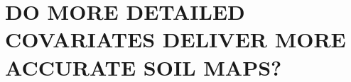 \artigotrue
\chapter{DO MORE DETAILED COVARIATES DELIVER MORE ACCURATE SOIL MAPS?}
\label{chap:chap05}

\def\elev{\texttt{ELEV}} %
\def\slp{\texttt{SLP}}   %
\def\asp{\texttt{ASP}}   %
\def\nor{\texttt{NOR}}   %
\def\acc{\texttt{ACC}}   %
\def\twi{\texttt{TWI}}   %
\def\spi{\texttt{SPI}}   %
\def\tpi{\texttt{TPI}}   %
\def\ndvi{\texttt{NDVI}} %
\def\savi{\texttt{SAVI}} %
\def\sibcs{Brazilian System of Soil Classification}

\def\portuguesekeys{Mapeamento Digital do Solo, Modelo Linear Misto, Informação Auxiliar, Seleção de Variáveis,
Acurácia do Modelo, Custo do Mapeamento do Solo}

